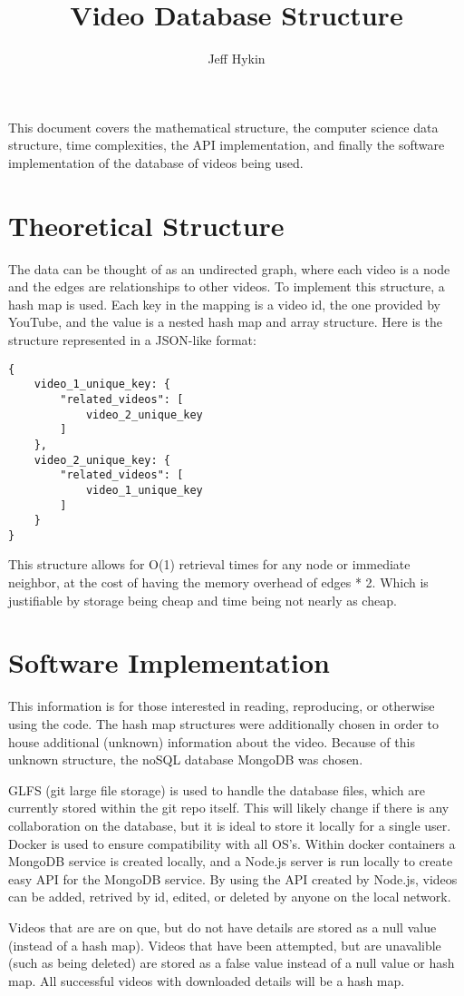 \documentclass{article}
\title{Video Database Structure}
\author{Jeff Hykin}
\begin{document}
\maketitle
% 
% 
\begin{Overview}
    This document covers the mathematical structure, the computer science data structure, time complexities, the API implementation, and finally the software implementation of the database of videos being used. 
\end{Overview}

\section{Theoretical Structure}

The data can be thought of as an undirected graph, where each video is a node and the edges are relationships to other videos. To implement this structure, a hash map is used. Each key in the mapping is a video id, the one provided by YouTube, and the value is a nested hash map and array structure. Here is the structure represented in a JSON-like format:

\begin{lstlisting}
{
    video_1_unique_key: {
        "related_videos": [
            video_2_unique_key
        ]
    },
    video_2_unique_key: {
        "related_videos": [
            video_1_unique_key
        ]
    }
}
\end{lstlisting}

This structure allows for O(1) retrieval times for any node or immediate neighbor, at the cost of having the memory overhead of edges * 2. Which is justifiable by storage being cheap and time being not nearly as cheap.

\section{Software Implementation}

This information is for those interested in reading, reproducing, or otherwise using the code. The hash map structures were additionally chosen in order to house additional (unknown) information about the video. Because of this unknown structure, the noSQL database MongoDB was chosen.

GLFS (git large file storage) is used to handle the database files, which are currently stored within the git repo itself. This will likely change if there is any collaboration on the database, but it is ideal to store it locally for a single user. Docker is used to ensure compatibility with all OS's. Within docker containers a MongoDB service is created locally, and a Node.js server is run locally to create easy API for the MongoDB service. By using the API created by Node.js, videos can be added, retrived by id, edited, or deleted by anyone on the local network.

Videos that are are on que, but do not have details are stored as a null value (instead of a hash map). Videos that have been attempted, but are unavalible (such as being deleted) are stored as a false value instead of a null value or hash map. All successful videos with downloaded details will be a hash map.


% 
% 
\end{document}
